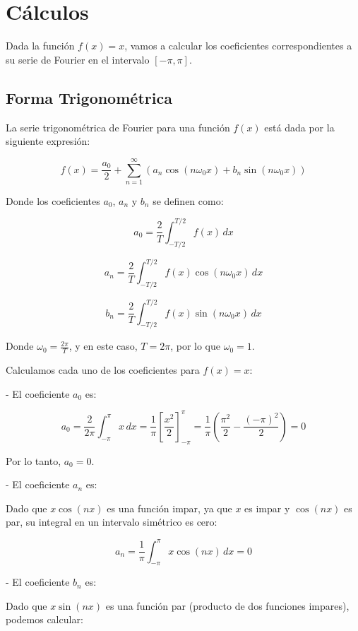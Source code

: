 \chapter{Cálculos}\label{app2:Estado-del-arte-coeff}

Dada la función \( f(x) = x \), vamos a calcular los coeficientes correspondientes a su serie de Fourier en el intervalo \([- \pi, \pi]\).

\section{Forma Trigonométrica}\label{app2:trig-coeff}

La serie trigonométrica de Fourier para una función \( f(x) \) está dada por la siguiente expresión:

\[
f(x) = \frac{a_0}{2} + \sum_{n=1}^{\infty} \left( a_n \cos(n \omega_0 x) + b_n \sin(n \omega_0 x) \right)
\]

Donde los coeficientes \( a_0 \), \( a_n \) y \( b_n \) se definen como:

\[
a_0 = \frac{2}{T} \int_{-T/2}^{T/2} f(x) \, dx
\]

\[
a_n = \frac{2}{T} \int_{-T/2}^{T/2} f(x) \cos(n \omega_0 x) \, dx
\]

\[
b_n = \frac{2}{T} \int_{-T/2}^{T/2} f(x) \sin(n \omega_0 x) \, dx
\]

Donde \( \omega_0 = \frac{2\pi}{T} \), y en este caso, \( T = 2\pi \), por lo que \( \omega_0 = 1 \).

Calculamos cada uno de los coeficientes para \( f(x) = x \):

- El coeficiente \( a_0 \) es:

\[
a_0 = \frac{2}{2\pi} \int_{-\pi}^{\pi} x \, dx = \frac{1}{\pi} \left[ \frac{x^2}{2} \right]_{-\pi}^{\pi} = \frac{1}{\pi} \left( \frac{\pi^2}{2} - \frac{(-\pi)^2}{2} \right) = 0
\]

Por lo tanto, \( a_0 = 0 \).

- El coeficiente \( a_n \) es:

Dado que \( x \cos(n x) \) es una función impar, ya que \( x \) es impar y \( \cos(n x) \) es par, su integral en un intervalo simétrico es cero:

\[
a_n = \frac{1}{\pi} \int_{-\pi}^{\pi} x \cos(n x) \, dx = 0
\]

- El coeficiente \( b_n \) es:

Dado que \( x \sin(n x) \) es una función par (producto de dos funciones impares), podemos calcular:

